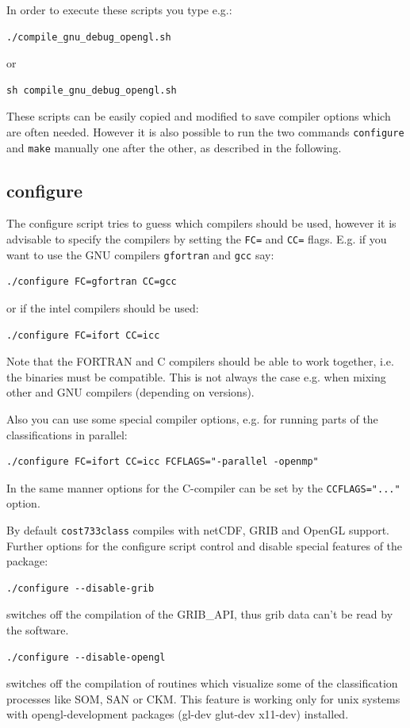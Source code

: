 \documentclass[12pt, oneside, a4paper, headsepline, plainheadsepline]{scrbook}
\begin{document}
In order to execute these scripts you type e.g.:
\begin{lstlisting}
./compile_gnu_debug_opengl.sh
\end{lstlisting}
or
\begin{lstlisting}
sh compile_gnu_debug_opengl.sh
\end{lstlisting}

These scripts can be easily copied and modified to save compiler options which are often needed. However it is also possible to run the two commands \verb!configure! and \verb!make! manually one after the other, as described in the following.

\subsection{configure}

The configure script tries to guess which compilers should be used, however
it is advisable to specify the compilers by setting the \verb+FC=+ and \verb+CC=+ flags. E.g. 
if you want to use the GNU compilers \verb+gfortran+ and \verb+gcc+ say:
\begin{lstlisting}
./configure FC=gfortran CC=gcc
\end{lstlisting}
or if the intel compilers should be used:
\begin{lstlisting}
./configure FC=ifort CC=icc
\end{lstlisting}
Note that the FORTRAN and C compilers should be able to work together, i.e. the binaries
must be compatible. This is not always the case e.g. when mixing other and GNU compilers (depending on versions).

Also you can use some special compiler options, e.g. for running parts of the classifications in parallel:
\begin{lstlisting}
./configure FC=ifort CC=icc FCFLAGS="-parallel -openmp"
\end{lstlisting}
In the same manner options for the C-compiler can be set by the \verb!CCFLAGS="..."! option.

By default \verb+cost733class+ compiles with netCDF, GRIB and OpenGL support.
Further options for the configure script control and disable special features of the package:
\begin{lstlisting}
./configure --disable-grib
\end{lstlisting}
switches off the compilation of the GRIB\_API, thus grib data can't be read by the software.
\begin{lstlisting}
./configure --disable-opengl
\end{lstlisting}
switches off the compilation of routines which visualize some of the classification processes like SOM, SAN or CKM.
This feature is working only for unix systems with opengl-development packages (gl-dev glut-dev x11-dev) installed.
\end{document}
